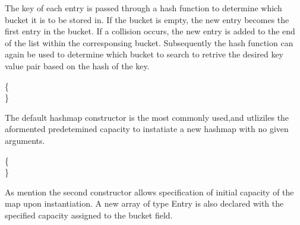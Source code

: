 \documentclass[a4paper]{article}
\begin{document}
The key of each entry is passed through a hash function to determine which bucket it is to be stored in.
If the bucket is empty, the new entry becomes the first entry in the bucket.
If a collision occurs, the new entry is added to the end of the list within the corresponsing bucket.
Subsequently the hash function can again be used to determine which bucket to search 
to retrive the desired key value pair based on the hash of the key.







\vspace{4mm}
\makeatletter
\renewcommand{\ALG@name}{Hashmap Constructor}
\makeatother
\setcounter{algorithm}{0}

\begin{algorithm}
\caption{}\label{euclid}
\begin{algorithmic}[1]

\algrenewcommand{}
 {\{}
 \\
{\}}
\EndProcedure
\end{algorithmic}
\end{algorithm}

The default hashmap constructor is the most commonly used,and utliziles the aformented 
predetemined capacity to instatiate a new hashmap with no given arguments.



\vspace{4mm}
\makeatletter
\renewcommand{\ALG@name}{Hashmap Constructor}
\makeatother

\begin{algorithm}
\caption{}\label{euclid}
\begin{algorithmic}[1]

\algrenewcommand{}
 {\{}
 \\
{\}}
\EndProcedure
\end{algorithmic}
\end{algorithm}

As mention the second constructor allows specification of initial capacity of the map upon instantiation.
A new array of type Entry is also declared with the specified capacity assigned to the bucket field. \pagebreak
\end{document}
